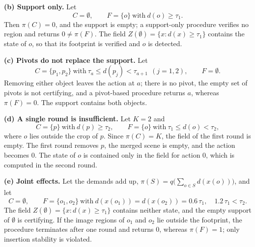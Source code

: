 \documentclass[10pt,letterpaper]{article}
\newcommand{\draft}{C}
\newcommand{\full}{F}
\newcommand{\field}{Z}
\newcommand{\policy}{\pi}
\newcommand{\dem}{d}
\theoremstyle{remark}
\theoremstyle{plain}
\theoremstyle{definition}
\begin{document}
\textbf{(b) Support only.}
Let
\begin{equation*}
\draft=\emptyset,\qquad \full=\{o\}\ \text{with}\ \dem(o)\ge\tau_1 .
\end{equation*}
Then $\policy(\draft)=0$, and the support is empty; a support-only procedure verifies no region and returns $0\neq\policy(\full)$.
The field $\field(\emptyset)=\{x:\dem(x)\ge\tau_1\}$ contains the state of $o$, so that its footprint is verified and $o$ is detected.

\textbf{(c) Pivots do not replace the support.}
Let
\begin{equation*}
\draft=\{p_1,p_2\}\ \text{with}\ \tau_a\le\dem(p_j)<\tau_{a+1}\ \ (j=1,2),\qquad \full=\emptyset .
\end{equation*}
Removing either object leaves the action at $a$; there is no pivot, the empty set of pivots is not certifying, and a pivot-based procedure returns $a$, whereas $\policy(\full)=0$.
The support contains both objects.

\textbf{(d) A single round is insufficient.}
Let $K=2$ and
\begin{equation*}
\draft=\{p\}\ \text{with}\ \dem(p)\ge\tau_2,\qquad \full=\{o\}\ \text{with}\ \tau_1\le\dem(o)<\tau_2,
\end{equation*}
where $o$ lies outside the crop of $p$.
Since $\policy(\draft)=K$, the field of the first round is empty.
The first round removes $p$, the merged scene is empty, and the action becomes $0$.
The state of $o$ is contained only in the field for action $0$, which is computed in the second round.

\textbf{(e) Joint effects.}
Let the demands add up, $\policy(S)=q\big(\sum_{o\in S}\dem(x(o))\big)$, and let
\begin{equation*}
\draft=\emptyset,\qquad \full=\{o_1,o_2\}\ \text{with}\ \dem(x(o_1))=\dem(x(o_2))=0.6\,\tau_1,\quad 1.2\,\tau_1<\tau_2 .
\end{equation*}
The field $\field(\emptyset)=\{x:\dem(x)\ge\tau_1\}$ contains neither state, and the empty support of $\emptyset$ is certifying.
If the image regions of $o_1$ and $o_2$ lie outside the footprint, the procedure terminates after one round and returns $0$, whereas $\policy(\full)=1$; only insertion stability is violated.
\end{document}
